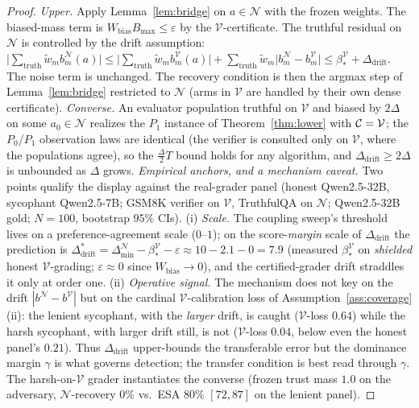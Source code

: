 \documentclass[11pt]{article}
\theoremstyle{definition}\newtheorem{definition}{Definition}
\theoremstyle{definition}\newtheorem{assumption}{Assumption}
\newcommand{\V}{\mathcal{V}}\newcommand{\N}{\mathcal{N}}
\begin{document}
\begin{proof}
\emph{Upper.} Apply Lemma~\ref{lem:bridge} on $a\in\N$ with the frozen weights.
The biased-mass term is $W_{\mathrm{bias}}B_{\max}\le\varepsilon$ by the
$\V$-certificate. The truthful residual on $\N$ is controlled by the drift
assumption:
$\big|\sum_{\mathrm{truth}}\tilde w_m b_m^{\N}(a)\big|
\le\big|\sum_{\mathrm{truth}}\tilde w_m b_m^{\V}(a)\big|
+\sum_{\mathrm{truth}}\tilde w_m\big|b_m^{\N}-b_m^{\V}\big|
\le\beta_\ast^{\V}+\Delta_{\mathrm{drift}}$.
The noise term is unchanged. The recovery condition is then the argmax step of
Lemma~\ref{lem:bridge} restricted to $\N$ (arms in $\V$ are handled by their own
dense certificate).
\emph{Converse.} An evaluator population truthful on $\V$ and biased by
$2\Delta$ on some $a_0\in\N$ realizes the $P_1$ instance of
Theorem~\ref{thm:lower} with $\Cov=\V$; the $P_0$/$P_1$ observation laws are
identical (the verifier is consulted only on $\V$, where the populations agree),
so the $\frac{\Delta}{2}T$ bound holds for any algorithm, and
$\Delta_{\mathrm{drift}}\ge 2\Delta$ is unbounded as $\Delta$ grows.
\emph{Empirical anchors, and a mechanism caveat.} Two points qualify the display
against the real-grader panel (honest Qwen2.5-32B, sycophant Qwen2.5-7B; GSM8K
verifier on $\V$, TruthfulQA on $\N$; Qwen2.5-32B gold; $N=100$, bootstrap $95\%$
CIs). (i) \emph{Scale.} The coupling sweep's threshold lives on a preference-agreement
scale ($0$--$1$); on the score-\emph{margin} scale of $\Delta_{\mathrm{drift}}$ the
prediction is $\Delta_{\mathrm{drift}}^{\ast}=\Delta_{\min}^{\N}-\beta_\ast^{\V}
-\varepsilon\approx 10-2.1-0=7.9$ (measured $\beta_\ast^{\V}$ on \emph{shielded}
honest $\V$-grading; $\varepsilon\!\approx\!0$ since $W_{\mathrm{bias}}\!\to\!0$),
and the certified-grader drift straddles it only at order one. (ii) \emph{Operative
signal.} The mechanism does not key on the drift $|b^{\N}-b^{\V}|$ but on the
cardinal $\V$-calibration loss of Assumption~\ref{ass:coverage}(ii): the lenient
sycophant, with the \emph{larger} drift, is caught ($\V$-loss $0.64$) while the harsh
sycophant, with larger drift still, is not ($\V$-loss $0.04$, below even the honest
panel's $0.21$). Thus $\Delta_{\mathrm{drift}}$ upper-bounds the transferable error
but the dominance margin $\gamma$ is what governs detection; the transfer condition is
best read through $\gamma$. The harsh-on-$\V$ grader instantiates the converse (frozen
trust mass $1.0$ on the adversary, $\N$-recovery $0\%$ vs.\ ESA $80\%$ $[72,87]$ on the
lenient panel).
\end{proof}
\end{document}
